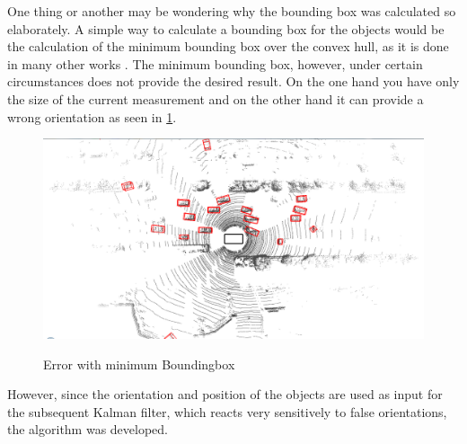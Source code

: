 \documentclass[11pt,oneside,openright]{mpreport}
\begin{document}

One thing or another may be wondering why the bounding box was calculated so elaborately. A simple way to calculate a bounding box for the
objects would be the calculation of the minimum bounding box over the convex hull, as it is done in many other works \cite{Zhang, Himmelsbach2009}.
The minimum bounding box, however, under certain circumstances does not provide the desired result. On the one hand you have only the size of the current measurement and on the 
other hand it can provide a wrong orientation as seen in \cref{min_box}.

\begin{figure}[!ht]
\caption{Error with minimum Boundingbox \cite{Zhang}}
\includegraphics[width=\textwidth]{bilder/min_bound_wrong.png}
\label{min_box}
\end{figure}


However, since the orientation and position of the objects are used as input for the subsequent Kalman filter, which reacts very sensitively to false orientations, the algorithm was developed.
\end{document}
